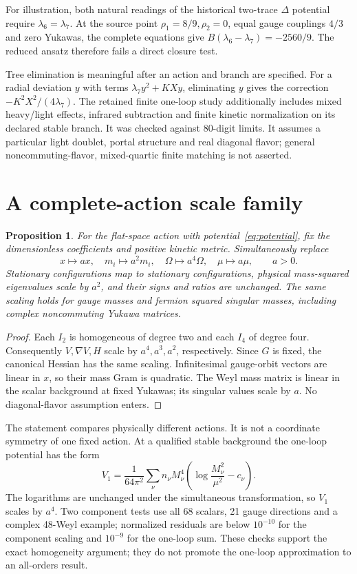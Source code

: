 \documentclass[11pt]{article}
\newtheorem{proposition}{Proposition}
\begin{document}
For illustration, both natural readings of the historical two-trace
$\Delta$ potential require $\lambda_6=\lambda_7$. At the source point
$\rho_1=8/9,\rho_2=0$, equal gauge couplings $4/3$ and zero Yukawas,
the complete equations give
$B(\lambda_6-\lambda_7)=-2560/9$.
The reduced ansatz therefore fails a direct closure test.

Tree elimination is meaningful after an action and branch are specified.
For a radial deviation $y$ with terms $\lambda_7y^2+KXy$, eliminating
$y$ gives the correction $-K^2X^2/(4\lambda_7)$.
The retained finite one-loop study additionally includes mixed heavy/light
effects, infrared subtraction and finite kinetic normalization on its
declared stable branch. It was checked against 80-digit limits. It assumes
a particular light doublet, portal structure and real diagonal flavor;
general noncommuting-flavor, mixed-quartic finite matching is not asserted.

\section{A complete-action scale family}
\begin{proposition}\label{prop:scale}
For the flat-space action with potential~\eqref{eq:potential}, fix the
dimensionless coefficients and positive kinetic metric. Simultaneously replace
\begin{equation}
 x\mapsto ax,\quad m_i\mapsto a^2m_i,\quad
 \Omega\mapsto a^4\Omega,\quad\mu\mapsto a\mu,
 \qquad a>0.
\end{equation}
Stationary configurations map to stationary configurations, physical
mass-squared eigenvalues scale by $a^2$, and their signs and ratios are
unchanged. The same scaling holds for gauge masses and fermion squared
singular masses, including complex noncommuting Yukawa matrices.
\end{proposition}
\begin{proof}
Each $I_2$ is homogeneous of degree two and each $I_4$ of degree four.
Consequently $V,\nabla V,H$ scale by $a^4,a^3,a^2$, respectively. Since
$G$ is fixed, the canonical Hessian has the same scaling. Infinitesimal
gauge-orbit vectors are linear in $x$, so their mass Gram is quadratic.
The Weyl mass matrix is linear in the scalar background at fixed Yukawas;
its singular values scale by $a$. No diagonal-flavor assumption enters.
\end{proof}

The statement compares physically different actions. It is not a coordinate
symmetry of one fixed action. At a qualified stable background the one-loop
potential has the form
\begin{equation}
 V_1=\frac1{64\pi^2}\sum_\nu n_\nu M_\nu^4
 \left(\log\frac{M_\nu^2}{\mu^2}-c_\nu\right).
\end{equation}
The logarithms are unchanged under the simultaneous transformation, so
$V_1$ scales by $a^4$. Two component tests use all 68 scalars, 21 gauge
directions and a complex 48-Weyl example; normalized residuals are below
$10^{-10}$ for the component scaling and $10^{-9}$ for the one-loop sum.
These checks support the exact homogeneity argument; they do not promote
the one-loop approximation to an all-orders result.
\end{document}
